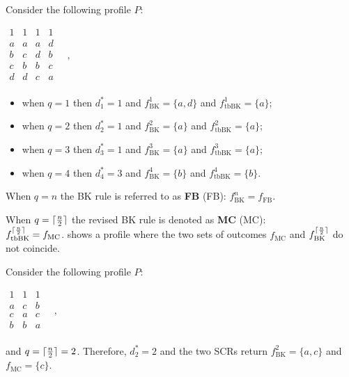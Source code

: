 \begin{example}
	\label{ex:BK}
	Consider the following profile $P$:
	\begin{center}
		$
		\begin{array}{cccc}
			1 & 1 & 1 & 1 \\
			a &	a & a & d \\
			b &	c & d & b \\
			c &	b & b & c \\
			d &	d & c & a \\
		\end{array} \quad, 
		$
	\end{center}
	\begin{itemize}
		\itemsep0em
		\item [] when $q=1$ then $d_{1}^{*}=1$ and $f_{\text{BK}}^{1}=\{a,d\}$ and $f_{\text{tbBK}}^{1}=\{a\}$;
		\item [] when $q=2$ then $d_{2}^{*}=1$ and $f_{\text{BK}}^{2}=\{a\}$ and $f_{\text{tbBK}}^{2}=\{a\}$;
		\item [] when $q=3$ then $d_{3}^{*}=1$ and $f_{\text{BK}}^{3}=\{a\}$ and $f_{\text{tbBK}}^{3}=\{a\}$;
		\item [] when $q=4$ then $d_{4}^{*}=3$ and $f_{\text{BK}}^{4}=\{b\}$ and $f_{\text{tbBK}}^{4}=\{b\}$.
	\end{itemize}
\end{example}

When $q=n$ the BK rule is referred to as \textbf{\acl{FB}} (\acs{FB}): $f_{\text{BK}}^{n}= f_{\text{FB}}$.

When $q=\lceil\frac{n}{2}\rceil$ the revised BK rule is denoted as \textbf{\acl{MC}} (\acs{MC}): 
\\$f_{\text{tbBK}}^{\lceil\frac{n}{2}\rceil}= f_{\text{MC}}$. 
 shows a profile where the two sets of outcomes $f_{\text{MC}}$ and $f_{\text{BK}}^{\lceil\frac{n}{2}\rceil}$ do not coincide.

\begin{example}
	\label{ex:BKvsMC}
	Consider the following profile $P$:
	\begin{center}
		$
		\begin{array}{ccc}
			1 & 1 & 1 \\
			a &	c & b \\
			c &	a & c \\
			b &	b & a \\
		\end{array} \quad, 
		$
	\end{center}
	and $q=\lceil\frac{n}{2}\rceil=2$. Therefore, $d_{2}^{*}=2$ and the two \acp{SCR} return $f_{\text{BK}}^{2}=\{a,c\}$ and $f_{\text{MC}}=\{c\}$.
\end{example}

